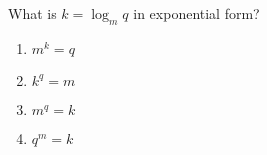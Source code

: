 \bigskip

\item What is $k=\log_m q$ in exponential form?

\begin{enumerate}
\item $m^k=q$
\item $k^q=m$
\item $m^q=k$
\item $q^m=k$
\end{enumerate}



